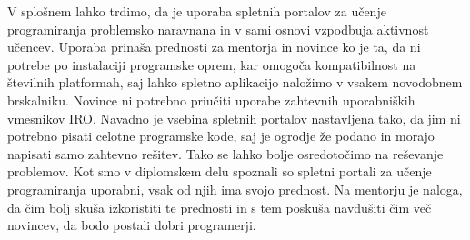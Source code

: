 V splošnem lahko trdimo, da je uporaba spletnih portalov za učenje
programiranja problemsko naravnana in v sami osnovi vzpodbuja
aktivnost učencev. Uporaba prinaša prednosti za mentorja in novince ko
je ta, da ni potrebe po instalaciji programske oprem, kar omogoča
kompatibilnost na številnih platformah, saj lahko spletno aplikacijo
naložimo v vsakem novodobnem brskalniku. Novince ni potrebno priučiti
uporabe zahtevnih uporabniških vmesnikov IRO. Navadno je vsebina
spletnih portalov nastavljena tako, da jim ni potrebno pisati celotne
programske kode, saj je ogrodje že podano in morajo napisati samo
zahtevno rešitev. Tako se lahko bolje osredotočimo na reševanje
problemov. Kot smo v diplomskem delu spoznali so spletni portali za
učenje programiranja uporabni, vsak od njih ima svojo prednost. Na
mentorju je naloga, da čim bolj skuša izkoristiti te prednosti in s
tem poskuša navdušiti čim več novincev, da bodo postali dobri
programerji.


